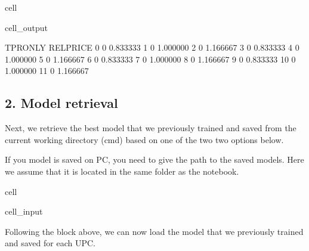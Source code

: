 \documentclass[letterpaper,10pt,english]{jupyterBook}
\begin{document}
\begin{sphinxuseclass}{cell}
\begin{sphinxVerbatimOutput}
\begin{sphinxuseclass}{cell_output}
\begin{sphinxVerbatim}[commandchars=\\\{\}]
    TPR\PYGZus{}ONLY  RELPRICE  
0          0  0.833333  
1          0  1.000000  
2          0  1.166667  
3          0  0.833333  
4          0  1.000000  
5          0  1.166667  
6          0  0.833333  
7          0  1.000000  
8          0  1.166667  
9          0  0.833333  
10         0  1.000000  
11         0  1.166667  
\end{sphinxVerbatim}

\end{sphinxuseclass}\end{sphinxVerbatimOutput}

\end{sphinxuseclass}

\subsection{2. Model retrieval}
\label{\detokenize{docs/Case1_3_Module1B_Retail_Demand_Predict:model-retrieval}}
\sphinxAtStartPar
Next, we retrieve the best model that we previously trained and saved from the current working directory (cmd) based on one of the two two options below.

\sphinxAtStartPar
If you model is saved on PC, you need to give the path to the saved models. Here we assume that it is located in the same folder as the notebook.

\begin{sphinxuseclass}{cell}\begin{sphinxVerbatimInput}

\begin{sphinxuseclass}{cell_input}
\begin{sphinxVerbatim}[commandchars=\\\{\}]
  
\end{sphinxVerbatim}

\end{sphinxuseclass}\end{sphinxVerbatimInput}

\end{sphinxuseclass}
\sphinxAtStartPar
Following the block above, we can now load the model that we previously trained and saved for each UPC.
\end{document}
